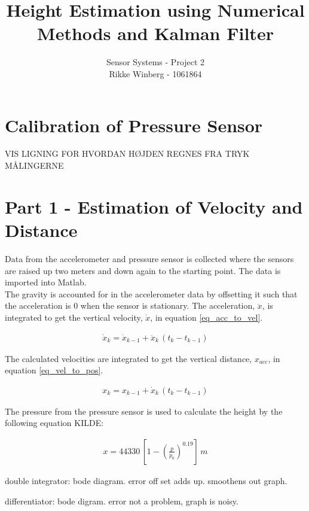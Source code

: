 \documentclass[fleqn,10pt]{olplainarticle}
\title{Height Estimation using Numerical Methods and Kalman Filter}
\author[1]{Sensor Systems - Project 2\\Rikke Winberg - 1061864}
\begin{document}
\flushbottom
\maketitle
\thispagestyle{empty}




\section{Calibration of Pressure Sensor}


VIS LIGNING FOR HVORDAN HØJDEN REGNES FRA TRYK MÅLINGERNE
 
\section{Part 1 - Estimation of Velocity and Distance}

Data from the accelerometer and pressure sensor is collected where the sensors are raised up two meters and down again to the starting point. The data is imported into Matlab.\\

The gravity is accounted for in the accelerometer data by offsetting it such that the acceleration is 0 when the sensor is stationary. The acceleration, $\ddot{x}$, is integrated to get the vertical velocity, $\dot{x}$, in equation \ref{eq_acc_to_vel}.

\begin{align}
    \dot{x}_k = \dot{x}_{k-1} + \ddot{x}_k \, (t_k - t_{k-1})
    \label{eq_acc_to_vel}
\end{align}

The calculated velocities are integrated to get the vertical distance, $x_{acc}$, in equation \ref{eq_vel_to_pos}.

\begin{align}
    x_{k} = x_{k-1} + \dot{x}_{k} \, (t_{k} - t_{k-1})
    \label{eq_vel_to_pos}
\end{align}

 The pressure from the pressure sensor is used to calculate the height by the following equation KILDE:

\begin{align}
    x = 44330 \, \left[ 1 - \left( \frac{p}{p_0} \right)^{0.19} \right] \, \textit{m}
\end{align}

double integrator: bode diagram. error off set adds up. smoothens out graph.

differentiator: bode digram. error not a problem, graph is noisy.
\end{document}
